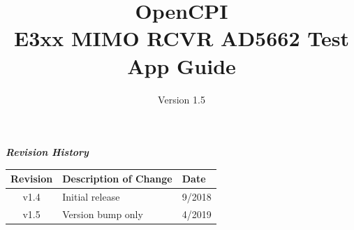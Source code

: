 \def\docTitle{OpenCPI\\ E3xx MIMO RCVR AD5662 Test App Guide}
\def\docVersion{1.5}
\def\snippetpath{../../../../../../doc/av/tex/snippets}


\date{Version \docVersion} %
\title{\docTitle}
\usepackage{graphicx}
\graphicspath{ {figures/} }
\usepackage{textcomp}
\usepackage{listings}


\maketitle
	\begin{center}
	\textit{\textbf{Revision History}}
		\begin{table}[H]
		\label{table:revisions} %
			\begin{tabularx}{\textwidth}{|c|X|l|}
			\hline
			\rowcolor{blue}
			\textbf{Revision} & \textbf{Description of Change} & \textbf{Date} \\
		    \hline
		    v1.4 & Initial release & 9/2018 \\
			\hline
		    v1.5 & Version bump only & 4/2019 \\
			\hline
			\end{tabularx}
		\end{table}
	\end{center}

